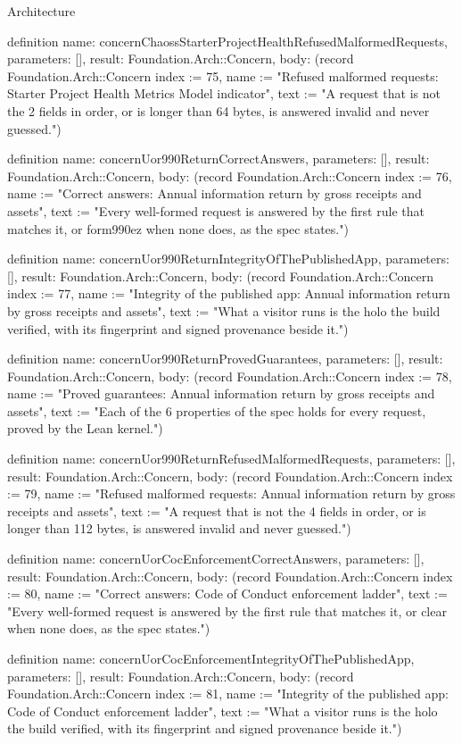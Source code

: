 \begin{lexlean}{Architecture}
\begin{semanticmodule}
definition{
  name: concernChaossStarterProjectHealthRefusedMalformedRequests,
  parameters: [],
  result: Foundation.Arch::Concern,
  body: (record Foundation.Arch::Concern {index := 75, name := "Refused malformed requests: Starter Project Health Metrics Model indicator", text := "A request that is not the 2 fields in order, or is longer than 64 bytes, is answered invalid and never guessed."})
}

definition{
  name: concernUor990ReturnCorrectAnswers,
  parameters: [],
  result: Foundation.Arch::Concern,
  body: (record Foundation.Arch::Concern {index := 76, name := "Correct answers: Annual information return by gross receipts and assets", text := "Every well-formed request is answered by the first rule that matches it, or form990ez when none does, as the spec states."})
}

definition{
  name: concernUor990ReturnIntegrityOfThePublishedApp,
  parameters: [],
  result: Foundation.Arch::Concern,
  body: (record Foundation.Arch::Concern {index := 77, name := "Integrity of the published app: Annual information return by gross receipts and assets", text := "What a visitor runs is the holo the build verified, with its fingerprint and signed provenance beside it."})
}

definition{
  name: concernUor990ReturnProvedGuarantees,
  parameters: [],
  result: Foundation.Arch::Concern,
  body: (record Foundation.Arch::Concern {index := 78, name := "Proved guarantees: Annual information return by gross receipts and assets", text := "Each of the 6 properties of the spec holds for every request, proved by the Lean kernel."})
}

definition{
  name: concernUor990ReturnRefusedMalformedRequests,
  parameters: [],
  result: Foundation.Arch::Concern,
  body: (record Foundation.Arch::Concern {index := 79, name := "Refused malformed requests: Annual information return by gross receipts and assets", text := "A request that is not the 4 fields in order, or is longer than 112 bytes, is answered invalid and never guessed."})
}

definition{
  name: concernUorCocEnforcementCorrectAnswers,
  parameters: [],
  result: Foundation.Arch::Concern,
  body: (record Foundation.Arch::Concern {index := 80, name := "Correct answers: Code of Conduct enforcement ladder", text := "Every well-formed request is answered by the first rule that matches it, or clear when none does, as the spec states."})
}

definition{
  name: concernUorCocEnforcementIntegrityOfThePublishedApp,
  parameters: [],
  result: Foundation.Arch::Concern,
  body: (record Foundation.Arch::Concern {index := 81, name := "Integrity of the published app: Code of Conduct enforcement ladder", text := "What a visitor runs is the holo the build verified, with its fingerprint and signed provenance beside it."})
}


\end{semanticmodule}
\end{lexlean}

